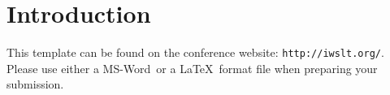 \section{Introduction}
This template can be found on the conference 
website: \texttt{http://iwslt.org/}.
Please use either a MS-Word\reg\ or a \LaTeX\ format file
when preparing your submission. 